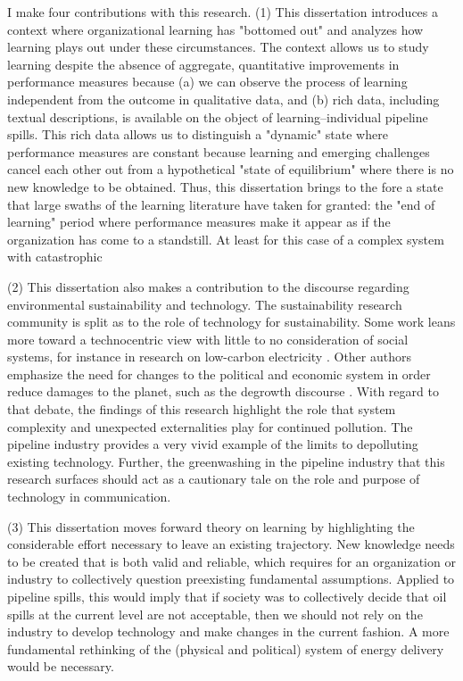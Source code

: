 I make four contributions with this research. (1) This dissertation introduces a context where organizational learning has "bottomed out" and analyzes how learning plays out under these circumstances. The context allows us to study learning despite the absence of aggregate, quantitative improvements in performance measures because (a) we can observe the process of learning independent from the outcome in qualitative data, and (b) rich data, including textual descriptions, is available on the object of learning--individual pipeline spills. This rich data allows us to distinguish a "dynamic" state where performance measures are constant because learning and emerging challenges cancel each other out from a hypothetical "state of equilibrium" where there is no new knowledge to be obtained. Thus, this dissertation brings to the fore a state that large swaths of the learning literature have taken for granted: the "end of learning" period where performance measures make it appear as if the organization has come to a standstill. At least for this case of a complex system with catastrophic 

(2) This dissertation also makes a contribution to the discourse regarding environmental sustainability and technology. The sustainability research community is split as to the role of technology for sustainability. Some work leans more toward a technocentric view with little to no consideration of social systems, for instance in research on low-carbon electricity \citep[e.g.,][]{Greenblatt2017}. Other authors emphasize the need for changes to the political and economic system in order reduce damages to the planet, such as the degrowth discourse \citep{Kallis2018}. With regard to that debate, the findings of this research highlight the role that system complexity and unexpected externalities play for continued pollution. The pipeline industry provides a very vivid example of the limits to depolluting existing technology. Further, the greenwashing in the pipeline industry that this research surfaces should act as a cautionary tale on the role and purpose of technology in communication.

(3) This dissertation moves forward theory on learning by highlighting the considerable effort necessary to leave an existing trajectory. New knowledge needs to be created that is both valid and reliable, which requires for an organization or industry to collectively question preexisting fundamental assumptions. Applied to pipeline spills, this would imply that if society was to collectively decide that oil spills at the current level are not acceptable, then we should not rely on the industry to develop technology and make changes in the current fashion. A more fundamental rethinking of the (physical and political) system of energy delivery would be necessary.

